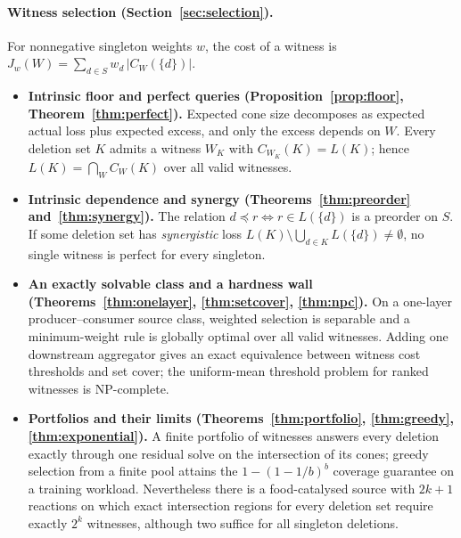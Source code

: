\documentclass[11pt,a4paper]{article}
\theoremstyle{plain}
\theoremstyle{definition}
\theoremstyle{remark}
\begin{document}
\paragraph{Witness selection (Section~\ref{sec:selection}).}
For nonnegative singleton weights $w$, the cost of a witness is $J_w(W)=\sum_{d\in S}w_d\,|C_W(\{d\})|$.
\begin{itemize}
\item \textbf{Intrinsic floor and perfect queries (Proposition~\ref{prop:floor}, Theorem~\ref{thm:perfect}).} Expected cone size decomposes as expected actual loss plus expected excess, and only the excess depends on $W$. Every deletion set $K$ admits a witness $W_K$ with $C_{W_K}(K)=L(K)$; hence $L(K)=\bigcap_W C_W(K)$ over all valid witnesses.
\item \textbf{Intrinsic dependence and synergy (Theorems~\ref{thm:preorder} and~\ref{thm:synergy}).} The relation $d\preccurlyeq r\iff r\in L(\{d\})$ is a preorder on $S$. If some deletion set has \emph{synergistic} loss $L(K)\setminus\bigcup_{d\in K}L(\{d\})\neq\emptyset$, no single witness is perfect for every singleton.
\item \textbf{An exactly solvable class and a hardness wall (Theorems~\ref{thm:onelayer}, \ref{thm:setcover}, \ref{thm:npc}).} On a one-layer producer--consumer source class, weighted selection is separable and a minimum-weight rule is globally optimal over all valid witnesses. Adding one downstream aggregator gives an exact equivalence between witness cost thresholds and set cover; the uniform-mean threshold problem for ranked witnesses is NP-complete.
\item \textbf{Portfolios and their limits (Theorems~\ref{thm:portfolio}, \ref{thm:greedy}, \ref{thm:exponential}).} A finite portfolio of witnesses answers every deletion exactly through one residual solve on the intersection of its cones; greedy selection from a finite pool attains the $1-(1-1/b)^{b}$ coverage guarantee on a training workload. Nevertheless there is a food-catalysed source with $2k+1$ reactions on which exact intersection regions for every deletion set require exactly $2^{k}$ witnesses, although two suffice for all singleton deletions.
\end{itemize}
\end{document}
